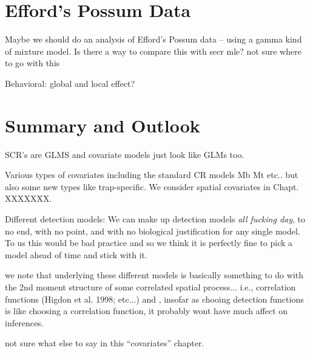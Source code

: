 \section{Efford's Possum Data}

Maybe we should do an analysis of Efford's Possum data -- using a
gamma kind of mixture model.  Is there a way to compare this with secr
mle?
not sure where to go with this


Behavioral: global and local effect?


\section{Summary and Outlook}


SCR's are GLMS and covariate models just look like GLMs too.

Various types of covariates including the standard CR models Mb Mt etc..
but also some new types like trap-specific. We consider spatial covariates
in Chapt. XXXXXXX.


Different detection models: We can make up detection models {\it all fucking 
day}, to no end, with no point, and with no biological justification for
any single model. To us this would be bad practice and so we think it is
perfectly fine to pick a model ahead of time and stick with it. 

we note that underlying these different models is basically something
to do with the 2nd moment structure of some correlated spatial process...
i.e., correlation functions (Higdon et al. 1998; etc...) and , insofar
as chooing detection functions is like choosing a correlation function,
it probably wont have much affect on inferences. 



not sure what else to say in this ``covariates'' chapter. 



